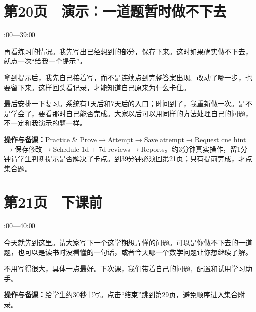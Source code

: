 \documentclass[UTF8,a4paper,11pt,fontset=fandol]{ctexart}
\newcommand{\tip}[1]{\par{\small\color{black!65}\noindent\textbf{操作与备课：}#1\par}}
\begin{document}
\par\noindent\begin{minipage}{\linewidth}

\section*{第20页　演示：一道题暂时做不下去}

{\small{}:00—39:00\par}

再看练习的情况。我先写出已经想到的部分，保存下来。这时如果确实做不下去，就点一次“给我一个提示”。

拿到提示后，我先自己接着写，而不是连续点到完整答案出现。改动了哪一步，也要留下来。这样回头看记录，才能知道自己原来为什么卡住。

最后安排一下复习。系统有1天后和7天后的入口；时间到了，我重新做一次。是不是学会了，要看那时自己能否完成。大家以后可以用同样的方法处理自己的问题，不一定和我演示的题一样。

\tip{Practice \& Prove$\to$Attempt$\to$Save attempt$\to$Request one hint$\to$保存修改$\to$Schedule 1d + 7d reviews$\to$Reports。约3分钟真实操作，留1分钟请学生判断提示是否解决了卡点。到39分钟必须回第21页；只有提前完成，才点集合题。}

\end{minipage}\par\vspace{2mm}

\par\noindent\begin{minipage}{\linewidth}

\section*{第21页　下课前}

{\small{}:00—40:00\par}

今天就先到这里。请大家写下一个这学期想弄懂的问题。可以是你做不下去的一道题，也可以是读书时没看懂的一句话，或者今天哪一个数学问题让你想继续了解。

不用写得很大，具体一点最好。下次课，我们带着自己的问题，配置和试用学习助手。

\tip{给学生约30秒书写。点击“结束”跳到第29页，避免顺序进入集合附录。}

\end{minipage}\par\vspace{2mm}
\end{document}
